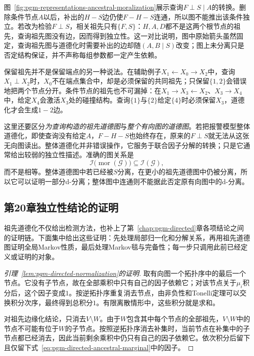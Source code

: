 图~\ref{fig:pgm-representations-ancestral-moralization}展示查询$F\perp S\mid A$的转换。删除条件节点$A$以后，补出的$H-S$边仍使$F-H-S$连通，所以图不能推出该条件独立。若改为检验$F\perp S$，相关祖先只有$\{F,S\}$：$H,A,D$都不是这两个根节点的祖先，查询祖先图没有边，因而得到独立性。这一对比说明，图中原始箭头虽然固定，查询祖先图与道德化时需要补出的边却随$(A,B\mid S)$改变；图上未分离只是否定结构保证，并不声称每组参数都一定产生依赖。

保留祖先并不是保留端点的另一种说法。在辅助例子$X_1\leftarrow X_0\to X_2$中，查询$X_1\perp X_2$时，$X_0$不在端点集合中，却是必须保留的共同祖先；只保留$\{1,2\}$会错误地把两个节点分开。条件节点的祖先也不可漏掉：在$X_1\to X_3\leftarrow X_2$、$X_3\to X_4$中，给定$X_4$会激活$X_3$处的碰撞结构。查询$\{1\}$与$\{2\}$给定$\{4\}$时必须保留$X_3$，道德化才会生成$1-2$边。

这里还要区分\emph{为查询构造的祖先道德图}与\emph{整个有向图的道德图}。若把报警模型整体道德化，即使查询没有给定$A$，$F-H-S$也始终存在，原来的$F\perp S$就无法从这张无向图读出。整体道德化并非错误操作，它服务于联合因子分解的转换；只是它通常给出较弱的独立性描述。准确的图关系是
\begin{equation}
  \mathcal{I}\bigl(\operatorname{mor}(\mathcal{G})\bigr)
  \subseteq \mathcal{I}(\mathcal{G}),
  \label{eq:pgm-representations-moral-inclusion}
\end{equation}
而不是相等。整体道德图中若已经被$S$分离，在更小的祖先道德图中仍被分离，所以它可以证明一部分d-分离；整体图中连通则不能据此否定原有向图中的d-分离。

\subsection{第20章独立性结论的证明}
\label{sec:pgm-representations-directed-proofs}

祖先道德化不仅给出检测方法，也补上了第~\ref{chap:pgm-directed}章各项结论之间的证明链。下面集中给出这些证明：先处理局部归一化和分解关系，再用祖先道德图证明全局Markov性质，最后处理Markov毯与完备性；每一步只调用此前已经定义或证明的对象。

\begin{proof}[引理~\ref{lem:pgm-directed-normalization}的证明]
取有向图一个拓扑序中的最后一个节点。它没有子节点，故在全部乘积中只有自己的因子依赖它；对该节点关于$\mu_i$积分后，这个因子变成$1$。按逆拓扑序重复消去节点，由非负性和Tonelli定理可以交换积分次序，最终得到总积分$1$。有限离散情形中，这些积分就是求和。

对祖先边缘化结论，只消去$V\setminus W$。由于$W$包含其中每个节点的全部祖先，$V\setminus W$中的节点不可能有位于$W$的子节点。按照逆拓扑序消去补集时，当前节点在补集中的子节点都已经消去，因此当前剩余乘积中仍只有自己的因子依赖它。依次积分后留下且仅留下式~\eqref{eq:pgm-directed-ancestral-marginal}中的因子。
\end{proof}

